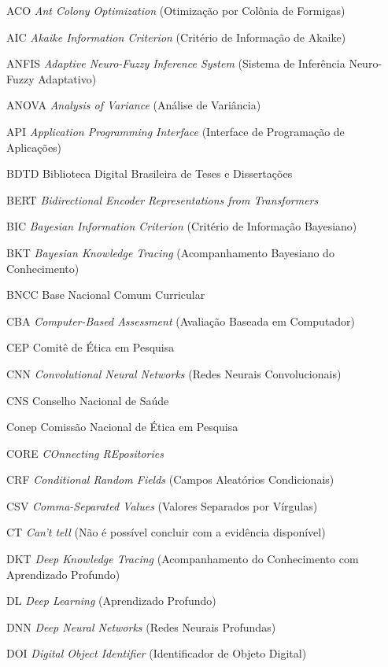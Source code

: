 \documentclass[
	12pt,
	oneside,
	a4paper,
	chapter=TITLE,
	section=TITLE,
	subsection=TITLE,
	english,
	brazil,
	sumario=tradicional,
]{abntex2-IFC}
\begin{document}
\begin{siglas}
  \item[ACO] \textit{Ant Colony Optimization} (Otimização por Colônia de Formigas)
  \item[AIC] \textit{Akaike Information Criterion} (Critério de Informação de Akaike)
  \item[ANFIS] \textit{Adaptive Neuro-Fuzzy Inference System} (Sistema de Inferência Neuro-Fuzzy Adaptativo)
  \item[ANOVA] \textit{Analysis of Variance} (Análise de Variância)
  \item[API] \textit{Application Programming Interface} (Interface de Programação de Aplicações)
  \item[BDTD] Biblioteca Digital Brasileira de Teses e Dissertações
  \item[BERT] \textit{Bidirectional Encoder Representations from Transformers}
  \item[BIC] \textit{Bayesian Information Criterion} (Critério de Informação Bayesiano)
  \item[BKT] \textit{Bayesian Knowledge Tracing} (Acompanhamento Bayesiano do Conhecimento)
  \item[BNCC] Base Nacional Comum Curricular
  \item[CBA] \textit{Computer-Based Assessment} (Avaliação Baseada em Computador)
  \item[CEP] Comitê de Ética em Pesquisa
  \item[CNN] \textit{Convolutional Neural Networks} (Redes Neurais Convolucionais)
  \item[CNS] Conselho Nacional de Saúde
  \item[Conep] Comissão Nacional de Ética em Pesquisa
  \item[CORE] \textit{COnnecting REpositories}
  \item[CRF] \textit{Conditional Random Fields} (Campos Aleatórios Condicionais)
  \item[CSV] \textit{Comma-Separated Values} (Valores Separados por Vírgulas)
  \item[CT] \textit{Can't tell} (Não é possível concluir com a evidência disponível)
  \item[DKT] \textit{Deep Knowledge Tracing} (Acompanhamento do Conhecimento com Aprendizado Profundo)
  \item[DL] \textit{Deep Learning} (Aprendizado Profundo)
  \item[DNN] \textit{Deep Neural Networks} (Redes Neurais Profundas)
  \item[DOI] \textit{Digital Object Identifier} (Identificador de Objeto Digital)

\end{siglas}
\end{document}
